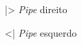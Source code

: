 

\begin{simbolos}
    \item[|>] \textit{Pipe} direito
    \item[<|] \textit{Pipe} esquerdo
\end{simbolos}
